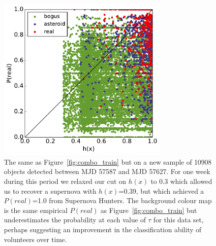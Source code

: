 \documentclass[a4paper,fleqn,usenatbib]{mnras}
\begin{document}
\begin{figure}
   \includegraphics[width=84mm]{figs/human_v_machine_20160725-20160829_1.pdf}
   \caption{The same as Figure~\ref{fig:combo_train} but on a new sample of 10908 objects detected between
            MJD 57587 and MJD 57627.  For one week during this period we relaxed our cut on $h(x)$ to 0.3 which allowed us to recover a supernova with $h(x)$=0.39, but which achieved a $P(real)$=1.0 from Supernova Hunters.  The background colour map is the same empirical $P(real)$ as Figure~\ref{fig:combo_train} but underestimates the probability at each value of $\tau$ for this data set, perhaps suggesting an improvement in the classification ability of volunteers over time.}
   \label{fig:combo_test} 
\end{figure}
\end{document}
